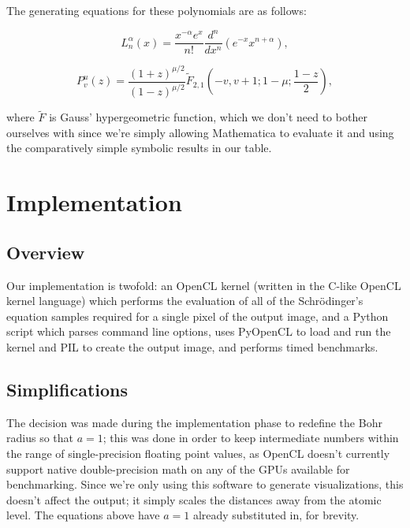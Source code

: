 \documentclass{acmsiggraph}
\begin{document}
The generating equations for these polynomials are as follows:

\begin{equation}\label{laguerre}
L^\alpha_n\left(x\right)=\frac{x^{-\alpha}e^x}{n!}\frac{d^n}{dx^n}\left(e^{-x}x^{n+\alpha}\right),
\end{equation}

\begin{equation}\label{legendre}
P^u_v\left(z\right)=\frac{\left(1+z\right)^{\mu/2}}{\left(1-z\right)^{\mu/2}}
\tilde{F}_{2,1}
\left(-v,v+1;1-\mu;\frac{1-z}{2}\right),
\end{equation}

where $\tilde{F}$ is Gauss' hypergeometric function, which we don't need to bother ourselves with since we're simply allowing Mathematica to evaluate it and using the comparatively simple symbolic results in our table.

\section{Implementation}

\subsection{Overview}

Our implementation is twofold: an OpenCL kernel (written in the C-like OpenCL kernel language) which performs the evaluation of all of the Schr\"{o}dinger's equation samples required for a single pixel of the output image, and a Python script which parses command line options, uses PyOpenCL to load and run the kernel and PIL to create the output image, and performs timed benchmarks.

\subsection{Simplifications}

\label{simpSection}

The decision was made during the implementation phase to redefine the Bohr radius so that $a=1$; this was done in order to keep intermediate numbers within the range of single-precision floating point values, as OpenCL doesn't currently support native double-precision math on any of the GPUs available for benchmarking. Since we're only using this software to generate visualizations, this doesn't affect the output; it simply scales the distances away from the atomic level. The equations above have $a=1$ already substituted in, for brevity.
\end{document}
